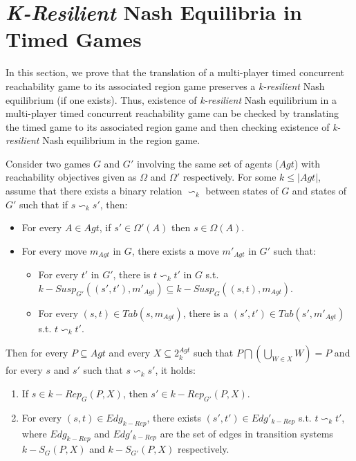 \section{\textit{K-Resilient} Nash Equilibria in Timed Games}

In this section, we prove that the translation of a multi-player timed concurrent reachability game to its associated region game preserves a \textit{k-resilient} Nash equilibrium (if one exists). Thus, existence of \textit{k-resilient} Nash equilibrium in a multi-player timed concurrent reachability game can be checked by translating the timed game to its associated region game and then checking existence of \textit{k-resilient} Nash equilibrium in the region game.

\begin{lemma}
\label{lemma8}
Consider two games $G$ and $G'$ involving the same set of agents ($Agt$) with reachability objectives given as $\Omega$ and $\Omega'$ respectively. For some $k \leq \vert Agt \vert$, assume that there exists a binary relation $\backsim_{k}$ between states of $G$ and states of $G'$ such that if $s \backsim_{k} s'$, then:
\begin{itemize}
\item For every $A \in Agt$, if $s' \in \Omega'(A)$ then $s \in \Omega(A)$.
\item For every move $m_{Agt}$ in $G$, there exists a move $m'_{Agt}$ in $G'$ such that:
\begin{itemize}
\item For every $t'$ in $G'$, there is $t \backsim_{k} t'$ in $G$ s.t. $k-Susp_{G'}((s', t'), m'_{Agt}) \subseteq k-Susp_{G}((s, t), m_{Agt})$.
\item For every $(s, t) \in Tab(s, m_{Agt})$, there is a $(s', t') \in Tab(s', m'_{Agt})$ s.t. $t \backsim_{k} t'$.
\end{itemize}
\end{itemize}
Then for every $P \subseteq Agt$ and every $X \subseteq 2^{Agt}_{k}$ such that $P \bigcap \left( \bigcup \limits_{W \in X}W \right) = P$ and for every $s$ and $s'$ such that $s \backsim_{k} s'$, it holds:
\begin{enumerate}
\item If $s \in k-Rep_{G}(P, X)$, then $s' \in k-Rep_{G'}(P, X)$.
\item For every $(s, t) \in Edg_{k-Rep}$, there exists $(s', t') \in Edg'_{k-Rep}$ s.t. $t \backsim_{k} t'$, where $Edg_{k-Rep}$ and $Edg'_{k-Rep}$ are the set of edges in transition systems $k-S_{G}(P, X)$ and $k-S_{G'}(P, X)$ respectively.
\end{enumerate}
\end{lemma}

